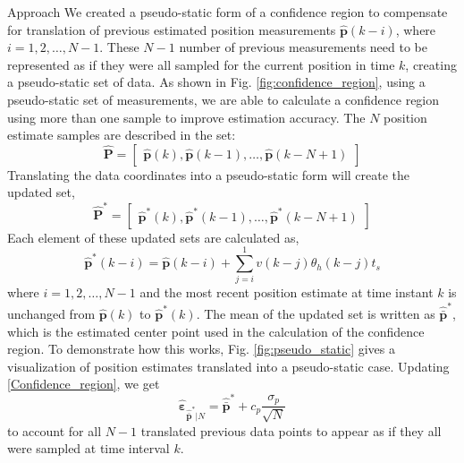 \begin{section}{Approach}
We created a pseudo-static form of a confidence region to compensate for translation of previous estimated position measurements $\hat{\bm{p}}(k-i)$, where $i=1,2,\dots,N-1$. These $N-1$ number of previous measurements need to be represented as if they were all sampled for the current position in time $k$, creating a pseudo-static set of data. As shown in Fig. \ref{fig:confidence_region}, using a pseudo-static set of measurements, we are able to calculate a confidence region using more than one sample to improve estimation accuracy. The $N$ position estimate samples are described in the set:
\begin{equation}
    \hat{\bm{P}}=\begin{bmatrix} \hat{\bm{p}}(k) ,\hat{\bm{p}}(k-1),\dots,\hat{\bm{p}}(k-N+1) \end{bmatrix} 
\end{equation}
Translating the data coordinates into a pseudo-static form will create the updated set,
\begin{equation}
    \hat{\bm{P}}^*=\begin{bmatrix} \hat{\bm{p}}^*(k) ,\hat{\bm{p}}^*(k-1),\dots,\hat{\bm{p}}^*(k-N+1) \end{bmatrix} \nonumber
\end{equation}
Each element of these updated sets are calculated as,
	\begin{equation}
	\hat{\bm{p}}^*(k-i) = \hat{\bm{p}}(k-i)+\sum_{j=i}^1 v(k-j)\theta_h(k-j)t_s 
	\end{equation}
where $i=1,2,\dots,N-1$ and the most recent position estimate at time instant $k$ is unchanged from $\hat{\bm{p}}(k)$ to $\hat{\bm{p}}^*(k)$. The mean of the updated set is written as $\hat{\bar{\bm{p}}}^*$, which is the estimated center point used in the calculation of the confidence region. To demonstrate how this works, Fig. \ref{fig:pseudo_static} gives a visualization of position estimates translated into a pseudo-static case. Updating \eqref{Confidence_region}, we get
    \begin{equation}
    \label{Confidence_region_updated}
		\hat{\bm{\varepsilon}}_{\hat{\bar{\bm{p}}}^*|N} = \hat{\bar{\bm{p}}}^* + c_p\frac{\sigma_p}{\sqrt{N}}
	\end{equation}
 to account for all $N-1$ translated previous data points to appear as if they all were sampled at time interval $k$.




\end{section}
